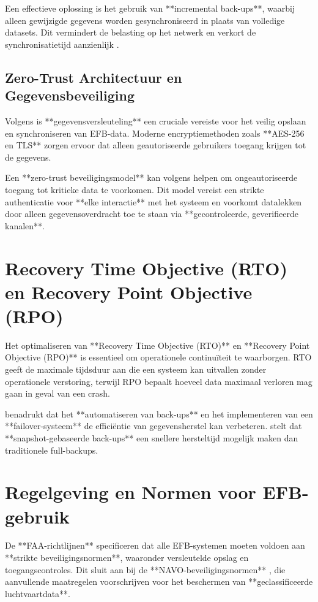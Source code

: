 \documentclass{hogent-article}
\begin{document}
    Een effectieve oplossing is het gebruik van **incremental back-ups**, waarbij alleen gewijzigde gegevens worden gesynchroniseerd in plaats van volledige datasets. Dit vermindert de belasting op het netwerk en verkort de synchronisatietijd aanzienlijk \autocite{VeeamRTO}.
    
    \subsection{Zero-Trust Architectuur en Gegevensbeveiliging}
    
    Volgens \textcite{NISTFIPS140} is **gegevensversleuteling** een cruciale vereiste voor het veilig opslaan en synchroniseren van EFB-data. Moderne encryptiemethoden zoals **AES-256 en TLS** zorgen ervoor dat alleen geautoriseerde gebruikers toegang krijgen tot de gegevens.
    
    Een **zero-trust beveiligingsmodel** kan volgens \textcite{VinayakBhuvi} helpen om ongeautoriseerde toegang tot kritieke data te voorkomen. Dit model vereist een strikte authenticatie voor **elke interactie** met het systeem en voorkomt datalekken door alleen gegevensoverdracht toe te staan via **gecontroleerde, geverifieerde kanalen**.
    
    \section{Recovery Time Objective (RTO) en Recovery Point Objective (RPO)}
    
    Het optimaliseren van **Recovery Time Objective (RTO)** en **Recovery Point Objective (RPO)** is essentieel om operationele continuïteit te waarborgen. RTO geeft de maximale tijdsduur aan die een systeem kan uitvallen zonder operationele verstoring, terwijl RPO bepaalt hoeveel data maximaal verloren mag gaan in geval van een crash.
    
    \textcite{VeeamRTO} benadrukt dat het **automatiseren van back-ups** en het implementeren van een **failover-systeem** de efficiëntie van gegevensherstel kan verbeteren. \textcite{MicrosoftBackup} stelt dat **snapshot-gebaseerde back-ups** een snellere hersteltijd mogelijk maken dan traditionele full-backups.
    
    \section{Regelgeving en Normen voor EFB-gebruik}
    
    De **FAA-richtlijnen** \autocite{FAA_AC91-78A} specificeren dat alle EFB-systemen moeten voldoen aan **strikte beveiligingsnormen**, waaronder versleutelde opslag en toegangscontroles. Dit sluit aan bij de **NAVO-beveiligingsnormen** \autocite{AD070001}, die aanvullende maatregelen voorschrijven voor het beschermen van **geclassificeerde luchtvaartdata**.
    
\end{document}
